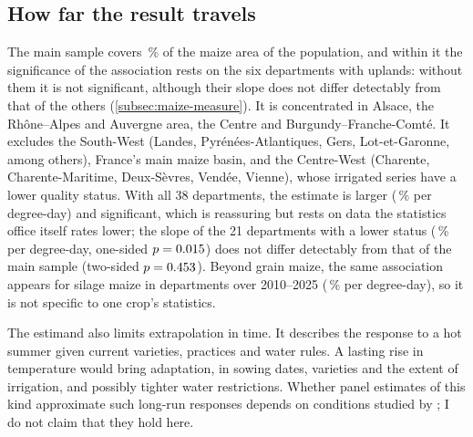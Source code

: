 \subsection{How far the result travels}

The main sample covers \MainShareArea\,\% of the maize area of the population, and within it the significance of the association rests on the six departments with uplands: without them it is not significant, although their slope does not differ detectably from that of the others (\cref{subsec:maize-measure}). It is concentrated in Alsace, the Rhône--Alpes and Auvergne area, the Centre and Burgundy--Franche-Comté. It excludes the South-West (Landes, Pyrénées-Atlantiques, Gers, Lot-et-Garonne, among others), France's main maize basin, and the Centre-West (Charente, Charente-Maritime, Deux-Sèvres, Vendée, Vienne), whose irrigated series have a lower quality status. With all 38 departments, the estimate is larger (\QoneAllDepsPct\,\% per degree-day) and significant, which is reassuring but rests on data the statistics office itself rates lower; the slope of the 21 departments with a lower status (\StatusTwoPct\,\% per degree-day, one-sided $p = 0.015$) does not differ detectably from that of the main sample (two-sided $p = 0.453$). Beyond grain maize, the same association appears for silage maize in \FodderDeps{} departments over 2010--2025 (\FodderPct\,\% per degree-day), so it is not specific to one crop's statistics.

The estimand also limits extrapolation in time. It describes the response to a hot summer given current varieties, practices and water rules. A lasting rise in temperature would bring adaptation, in sowing dates, varieties and the extent of irrigation, and possibly tighter water restrictions. Whether panel estimates of this kind approximate such long-run responses depends on conditions studied by \textcite{merel2021}; I do not claim that they hold here.

